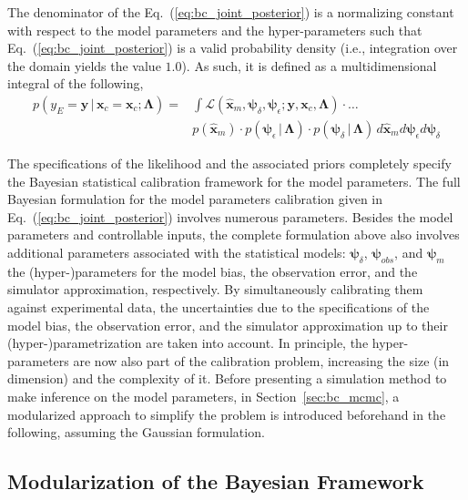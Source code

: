 The denominator of the Eq.~(\ref{eq:bc_joint_posterior}) is a normalizing constant with respect to the model parameters and the hyper-parameters such that Eq.~(\ref{eq:bc_joint_posterior}) is a valid probability density (i.e., integration over the domain yields the value $1.0$).
As such, it is defined as a multidimensional integral of the following,
\begin{equation}
	\begin{split}
	p(y_E = \mathbf{y} \,|\, \bm{x}_c = \mathbf{x}_c ; \bm{\Lambda}) = & \int \mathcal{L}(\hat{\bm{x}}_m,\bm{\psi}_\delta, \bm{\psi}_\epsilon ;  \mathbf{y}, \mathbf{x}_c, \bm{\Lambda}) \cdot \ldots \\
	& p(\hat{\bm{x}}_m) \cdot p(\bm{\psi}_\epsilon\,|\,\bm{\Lambda}) \cdot p(\bm{\psi}_\delta\,|\,\bm{\Lambda}) \, d\hat{\bm{x}}_m d\bm{\psi}_\epsilon d\bm{\psi}_\delta
	\end{split}
\label{eq:bc_normalizing_constant}
\end{equation}

The specifications of the likelihood and the associated priors completely specify the Bayesian statistical calibration framework for the model parameters.
The full Bayesian formulation for the model parameters calibration given in Eq.~(\ref{eq:bc_joint_posterior}) involves numerous parameters.
Besides the model parameters and controllable inputs, the complete formulation above also involves additional parameters associated with the statistical models: $\bm{\psi}_\delta$, $\bm{\psi}_{obs}$, and $\bm{\psi}_m$ the (hyper-)para\-meters for the model bias, the observation error, and the simulator approximation, respectively.
By simultaneously calibrating them against experimental data,
the uncertainties due to the specifications of the model bias, the observation error, and the simulator approximation up to their (hyper-)parametrization are taken into account.
In principle, the hyper-parameters are now also part of the calibration problem, increasing the size (in dimension) and the complexity of it.
Before presenting a simulation method to make inference on the model parameters, in Section~\ref{sec:bc_mcmc}, 
a modularized approach \cite{Liu2005} to simplify the problem is introduced beforehand in the following, assuming the Gaussian formulation.

\subsection{Modularization of the Bayesian Framework}\label{sub:bc_modularization}

